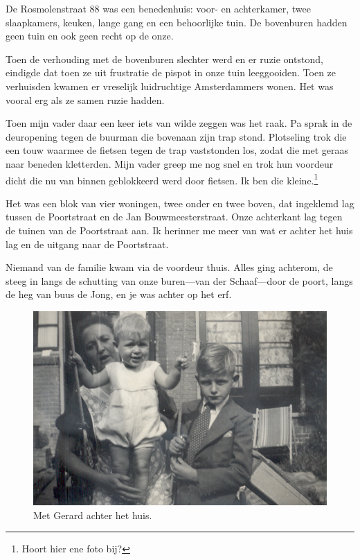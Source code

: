 \documentclass[12pt,twoside]{memoir}
\begin{document}
De Rosmolenstraat 88 was een benedenhuis: voor- en achterkamer, twee slaapkamers, keuken, lange gang en een behoorlijke tuin. De bovenburen hadden geen tuin en ook geen recht op de onze. 

Toen de verhouding met de bovenburen slechter werd en er ruzie ontstond, eindigde dat toen ze uit frustratie de pispot in onze tuin leeggooiden. Toen ze verhuisden kwamen er vreselijk luidruchtige Amsterdammers wonen. Het was vooral erg als ze samen ruzie hadden. 

Toen mijn vader daar een keer iets van wilde zeggen was het raak. Pa sprak in de deuropening tegen de buurman die bovenaan zijn trap stond. Plotseling trok die een touw waarmee de fietsen tegen de trap vaststonden los, zodat die met geraas naar beneden kletterden. Mijn vader greep me nog snel en trok hun voordeur dicht die nu van binnen geblokkeerd werd door fietsen. Ik ben die kleine.\footnote{Hoort hier ene foto bij?}

Het was een blok van vier woningen, twee onder en twee boven, dat ingeklemd lag tussen de Poortstraat en de Jan Bouwmeesterstraat. Onze achterkant lag tegen de tuinen van de Poortstraat aan. Ik herinner me meer van wat er achter het huis lag en de uitgang naar de Poortstraat. 

Niemand van de familie kwam via de voordeur thuis. Alles ging achterom, de steeg in langs de schutting van onze buren---van der Schaaf---door de poort, langs de heg van buus de Jong, en je was achter op het erf. 

\begin{figure}
\includegraphics[width=\textwidth]{img/ch5/Rosmstraat3}
\caption*{\footnotesize Met Gerard achter het huis.}
\end{figure}
\end{document}
